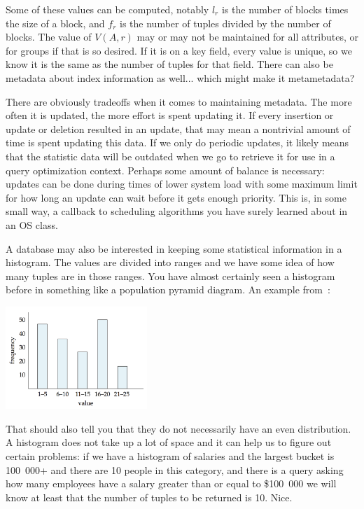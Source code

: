 Some of these values can be computed, notably $l_{r}$ is the number of blocks times the size of a block, and $f_{r}$ is the number of tuples divided by the number of blocks. The value of $V(A, r)$ may or may not be maintained for all attributes, or for groups if that is so desired. If it is on a key field, every value is unique, so we know it is the same as the number of tuples for that field. There can also be metadata about index information as well... which might make it metametadata? 

There are obviously tradeoffs when it comes to maintaining metadata. The more often it is updated, the more effort is spent updating it. If every insertion or update or deletion resulted in an update, that may mean a nontrivial amount of time is spent updating this data. If we only do periodic updates, it likely means that the statistic data will be outdated when we go to retrieve it for use in a query optimization context. Perhaps some amount of balance is necessary: updates can be done during times of lower system load with some maximum limit for how long an update can wait before it gets enough priority. This is, in some small way, a callback to scheduling algorithms you have surely learned about in an OS class. 

A database may also be interested in keeping some statistical information in a histogram. The values are divided into ranges and we have some idea of how many tuples are in those ranges. You have almost certainly seen a histogram before in something like a population pyramid diagram. An example from~\cite{dsc}:

\begin{center}
\includegraphics[width=0.4\textwidth]{images/histogram}
\end{center}

That should also tell you that they do not necessarily have an even distribution. A histogram does not take up a lot of space and it can help us to figure out certain problems: if we have a histogram of salaries and the largest bucket is 100~000+ and there are 10 people in this category, and there is a query asking how many employees have a salary greater than or equal to \$100~000 we will know at least that the number of tuples to be returned is 10. Nice.

